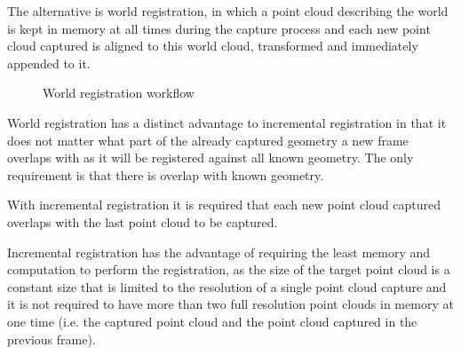 \documentclass{entcs}
\begin{document}
The alternative is world registration, in which a point cloud describing the
world is kept in memory at all times during the capture process and each new
point cloud captured is aligned to this world cloud, transformed and
immediately appended to it.

\begin{figure}[h!]
  \centering
  \caption{World registration workflow}
  \label{fig:world_alignment_workflow}
\end{figure}

World registration has a distinct advantage to incremental registration in that
it does not matter what part of the already captured geometry a new frame
overlaps with as it will be registered against all known geometry. The only
requirement is that there is overlap with known geometry.

With incremental registration it is required that each new point cloud captured
overlaps with the last point cloud to be captured.

Incremental registration has the advantage of requiring the least memory and
computation to perform the registration, as the size of the target point cloud
is a constant size that is limited to the resolution of a single point cloud
capture and it is not required to have more than two full resolution point
clouds in memory at one time (i.e. the captured point cloud and the point cloud
captured in the previous frame).
\end{document}
